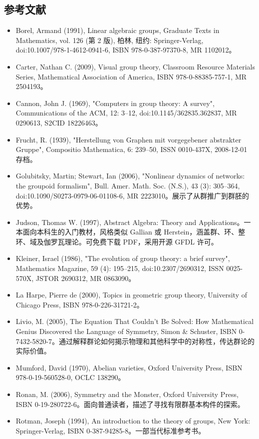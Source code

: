 \subsection{参考文献}
\begin{itemize}
\item Borel, Armand (1991), Linear algebraic groups, Graduate Texts in Mathematics, vol. 126 (第 2 版), 柏林, 纽约: Springer-Verlag, doi:10.1007/978-1-4612-0941-6, ISBN 978-0-387-97370-8, MR 1102012。
\item Carter, Nathan C. (2009), Visual group theory, Classroom Resource Materials Series, Mathematical Association of America, ISBN 978-0-88385-757-1, MR 2504193。
\item Cannon, John J. (1969), "Computers in group theory: A survey", Communications of the ACM, 12: 3–12, doi:10.1145/362835.362837, MR 0290613, S2CID 18226463。
\item Frucht, R. (1939), "Herstellung von Graphen mit vorgegebener abstrakter Gruppe", Compositio Mathematica, 6: 239–50, ISSN 0010-437X, 2008-12-01 存档。
\item Golubitsky, Martin; Stewart, Ian (2006), "Nonlinear dynamics of networks: the groupoid formalism", Bull. Amer. Math. Soc. (N.S.), 43 (3): 305–364, doi:10.1090/S0273-0979-06-01108-6, MR 2223010。展示了从群推广到群胚的优势。
\item Judson, Thomas W. (1997), Abstract Algebra: Theory and Applications。一本面向本科生的入门教材，风格类似 Gallian 或 Herstein，涵盖群、环、整环、域及伽罗瓦理论。可免费下载 PDF，采用开源 GFDL 许可。
\item Kleiner, Israel (1986), "The evolution of group theory: a brief survey", Mathematics Magazine, 59 (4): 195–215, doi:10.2307/2690312, ISSN 0025-570X, JSTOR 2690312, MR 0863090。
\item La Harpe, Pierre de (2000), Topics in geometric group theory, University of Chicago Press, ISBN 978-0-226-31721-2。
\item Livio, M. (2005), The Equation That Couldn't Be Solved: How Mathematical Genius Discovered the Language of Symmetry, Simon & Schuster, ISBN 0-7432-5820-7。通过解释群论如何揭示物理和其他科学中的对称性，传达群论的实际价值。
\item Mumford, David (1970), Abelian varieties, Oxford University Press, ISBN 978-0-19-560528-0, OCLC 138290。
\item Ronan, M. (2006), Symmetry and the Monster, Oxford University Press, ISBN 0-19-280722-6。面向普通读者，描述了寻找有限群基本构件的探索。
\item Rotman, Joseph (1994), An introduction to the theory of groups, New York: Springer-Verlag, ISBN 0-387-94285-8。一部当代标准参考书。

\end{itemize}

